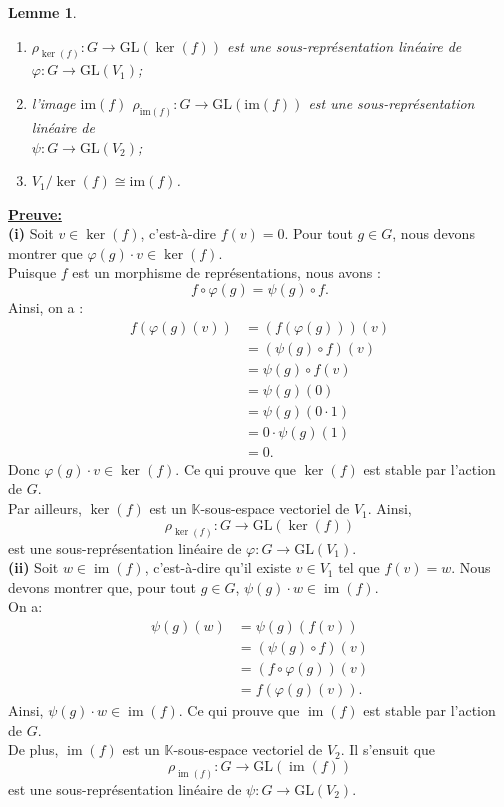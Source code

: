 \documentclass[a4paper, 14pt]{report}
\newtheorem{lemma}{Lemme}
\begin{document}
\begin{onehalfspace}
{\begin{lemma}
	\begin{enumerate} [label=\roman*)]
		\item \( \rho_{\ker(f)} : G \rightarrow \mathrm{GL}(\ker(f)) \) est une sous-représentation linéaire de \( \varphi : G \to \mathrm{GL}(V_1) \);
		\item l'image \( \mathrm{im}(f) \)  \( \rho_{\mathrm{im}(f)} : G \rightarrow \mathrm{GL}(\mathrm{im}(f)) \) est une sous-représentation linéaire de \\
		\( \psi : G \to \mathrm{GL}(V_2) \);
		\item \(V_1 / \ker(f) \cong \mathrm{im}(f)  \).
	\end{enumerate}
\end{lemma}



\textbf{\underline{Preuve:}}\\
\textbf{(i)} Soit \( v \in \ker(f) \), c’est-à-dire \( f(v) = 0 \). Pour tout \( g \in G \), nous devons montrer que \( \varphi(g) \cdot v \in \ker(f) \).\\
Puisque \( f \) est un morphisme de représentations, nous avons :  
\[
f \circ \varphi(g) = \psi(g) \circ f.
\]
Ainsi, on a :  
\[
\begin{aligned}
	f(\varphi(g)(v)) &= (f(\varphi(g)))(v) \\
	&= (\psi(g) \circ f)(v) \\
	&= \psi(g) \circ f(v) \\
	&= \psi(g)(0) \\
	&= \psi(g)(0 \cdot 1) \\
	&= 0 \cdot \psi(g)(1) \\
	&= 0.
\end{aligned}
\]
Donc \( \varphi(g) \cdot v \in \ker(f) \). Ce qui prouve que \( \ker(f) \) est stable par l’action de \( G \).\\
Par ailleurs, \( \ker(f) \) est un \( \mathbb{K} \)-sous-espace vectoriel de \( V_1 \). Ainsi, 
\[ \rho_{\ker(f)} : G \to \mathrm{GL}(\ker(f))\]  
est une sous-représentation linéaire de \( \varphi : G \to \mathrm{GL}(V_1) \).\\
\textbf{(ii)} Soit \( w \in \operatorname{im}(f) \), c’est-à-dire qu’il existe \( v \in V_1 \) tel que \( f(v) = w \). Nous devons montrer que, pour tout \( g \in G \), \( \psi(g) \cdot w \in \operatorname{im}(f) \).  \\
On a:  
\[
\begin{aligned}
	\psi(g)(w) &= \psi(g)(f(v)) \\
	&= (\psi(g) \circ f)(v) \\
	&= (f \circ \varphi(g))(v) \\
	&= f(\varphi(g)(v)).
\end{aligned}
\]
Ainsi, \( \psi(g) \cdot w \in \operatorname{im}(f) \). Ce qui prouve que \( \operatorname{im}(f) \) est stable par l’action de \( G \).\\  
De plus, \( \operatorname{im}(f) \) est un \( \mathbb{K} \)-sous-espace vectoriel de \( V_2 \). Il s’ensuit que
\[\rho_{\operatorname{im}(f)} : G \to \mathrm{GL}(\operatorname{im}(f))\]
est une sous-représentation linéaire de  
\( \psi : G \to \mathrm{GL}(V_2) \).\\	

}
\end{onehalfspace}
\end{document}
